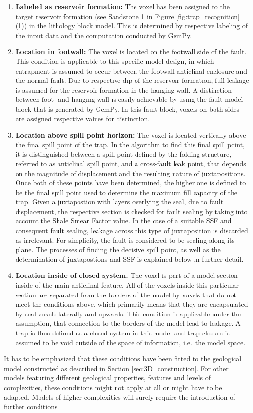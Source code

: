 		\begin{enumerate}
			\item \textbf{Labeled as reservoir formation:} The voxel has been assigned to the target reservoir formation (see Sandstone 1 in Figure \ref{fig:trap_recognition} (1)) in the lithology block model. This is determined by respective labeling of the input data and the computation conducted by GemPy.
			\item \textbf{Location in footwall:} The voxel is located on the footwall side of the fault. This condition is applicable to this specific model design, in which entrapment is assumed to occur between the footwall anticlinal enclosure and the normal fault. Due to respective dip of the reservoir formation, full leakage is assumed for the reservoir formation in the hanging wall. A distinction between foot- and hanging wall is easily achievable by using the fault model block that is generated by GemPy. In this fault block, voxels on both sides are assigned respective values for distinction.
			\item \textbf{Location above spill point horizon:} The voxel is located vertically above the final spill point of the trap. In the algorithm to find this final spill point, it is distinguished between a spill point defined by the folding structure, referred to as anticlinal spill point, and a cross-fault leak point, that depends on the magnitude of displacement and the resulting nature of juxtapositions. Once both of these points have been determined, the higher one is defined to be the final spill point used to determine the maximum fill capacity of the trap.  Given a juxtapostion with layers overlying the seal, due to fault displacement, the respective section is checked for fault sealing by taking into account the Shale Smear Factor value. In the case of a suitable SSF and consequent fault sealing, leakage across this type of juxtaposition is discarded as irrelevant. For simplicity, the fault is considered to be sealing along its plane. The processes of finding the decisive spill point, as well as the determination of juxtapostions and SSF is explained below in further detail.
			\item \textbf{Location inside of closed system:} The voxel is part of a model section inside of the main anticlinal feature. All of the voxels inside this particular section are separated from the borders of the model by voxels that do not meet the conditions above, which primarily means that they are encapsulated by seal voxels laterally and upwards. This condition is applicable  under the assumption, that connection to the borders of the model lead to leakage. A trap is thus defined as a closed system in this model and trap closure is assumed to be void outside of the space of information, i.e.\ the model space.	
		\end{enumerate}
		It has to be emphasized that these conditions have been fitted to the geological model constructed as described in Section \ref{sec:3D_construction}. For other models featuring different geological properties, features and levels of complexities, these conditions might not apply at all or might have to be adapted. Models of higher complexities will surely require the introduction of further conditions.
		
